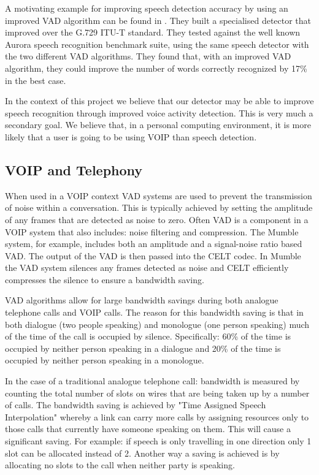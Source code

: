 \documentclass[ %
                    author={Sam Phippen},
                supervisor={Dr. Rafal Bogacz},
                     title={Real time voice activity detectors in noisy personal computing environments},
                  subtitle={},
                    degree={MEng},
                      year={2012} ]{thesis}
\begin{document}
A motivating example for improving speech detection accuracy by using an
improved VAD algorithm can be found in \cite{ramirez-2}. They built a
specialised detector that improved over the G.729 ITU-T\cite{itut} standard.
They tested against the well known Aurora\cite{aurora} speech recognition
benchmark suite, using the same speech detector with the two different VAD
algorithms. They found that, with an improved VAD algorithm, they could improve
the number of words correctly recognized by 17\% in the best case.

In the context of this project we believe that our detector may be able to
improve speech recognition through improved voice activity detection. This is
very much a secondary goal. We believe that, in a personal computing
environment, it is more likely that a user is going to be using VOIP than
speech detection.

\subsection{VOIP and Telephony}

When used in a VOIP context VAD systems are used to prevent the transmission of
noise within a conversation. This is typically achieved by setting the
amplitude of any frames that are detected as noise to zero. Often VAD is a
component in a VOIP system that also includes: noise filtering and compression.
The Mumble\cite{mumble} system, for example, includes both an amplitude and a
signal-noise ratio based VAD. The output of the VAD is then passed into the
CELT\cite{celt} codec. In Mumble the VAD system silences any frames detected as
noise and CELT efficiently compresses the silence to ensure a bandwidth saving.

VAD algorithms allow for large bandwidth savings during both analogue
telephone calls and VOIP calls. The reason for this bandwidth saving is that in
both dialogue (two people speaking) and monologue (one person speaking) much of
the time of the call is occupied by silence. Specifically: 60\% of the time is
occupied by neither person speaking\cite{shah} in a dialogue and 20\% of the
time is occupied by neither person speaking in a monologue.

In the case of a traditional analogue telephone call: bandwidth is measured by
counting the total number of slots on wires that are being taken up by a number
of calls. The bandwidth saving is achieved by "Time Assigned Speech
Interpolation" whereby a link can carry more calls by assigning resources only
to those calls that currently have someone speaking on them. This will cause a
significant saving. For example: if speech is only travelling in one direction
only 1 slot can be allocated instead of 2. Another way a saving is achieved is
by allocating no slots to the call when neither party is
speaking\cite{5016247}.
\end{document}
